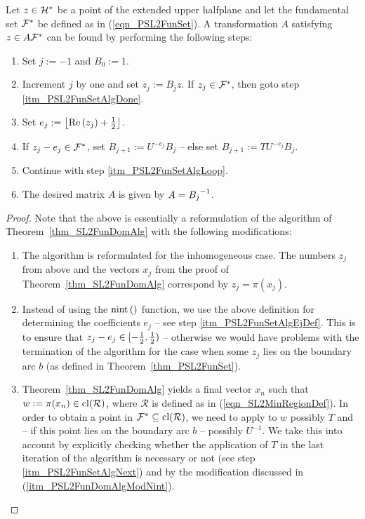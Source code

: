 \begin{theorem}
Let $z \in \mathcal{H}^\ast$ be a point of the extended upper halfplane and let the fundamental set $\mathcal{F}^\ast$ be defined as in (\ref{eqn_PSL2FunSet}). A transformation $A$ satisfying $z \in A \mathcal{F}^\ast$ can be found by performing the following steps:
\begin{enumerate}
\item Set $j := -1$ and $B_0 := 1$.
\item \label{itm_PSL2FunSetAlgLoop}
Increment $j$ by one and set $z_j := B_j z$. If $z_j \in \mathcal{F}^\ast$, then goto step \ref{itm_PSL2FunSetAlgDone}.
\item \label{itm_PSL2FunSetAlgEjDef}
Set $e_j := \left\lfloor \operatorname{Re}\left(z_j\right) + \frac{1}{2} \right\rfloor$. 
\item \label{itm_PSL2FunSetAlgNext}
If $z_j - e_j \in \mathcal{F}^\ast$, set $B_{j+1} := U^{-e_j}B_j$ -- else set $B_{j+1} := TU^{-e_j}B_j$.
\item Continue with step \ref{itm_PSL2FunSetAlgLoop}.
\item \label{itm_PSL2FunSetAlgDone} 
The desired matrix $A$ is given by $A = {B_j}^{-1}$.
\end{enumerate}
\end{theorem}
\begin{proof}
Note that the above is essentially a reformulation of the algorithm of Theorem~\ref{thm_SL2FunDomAlg} with the following modifications:
\begin{enumerate}[\quad (a)]
\item The algorithm is reformulated for the inhomogeneous case. The numbers $z_j$ from above and the vectors $x_j$ from the proof of Theorem~\ref{thm_SL2FunDomAlg} correspond by $z_j = \pi(x_j)$.
\item \label{itm_PSL2FunDomAlgModNint}
Instead of using the $\operatorname{nint}\left(  \right)$ function, we use the above definition  for determining the coefficients $e_j$ -- see step \ref{itm_PSL2FunSetAlgEjDef}. This is to ensure that $z_j - e_j \in [-\frac{1}{2}, \frac{1}{2})$ -- otherwise we would have problems with the termination of the algorithm for the case when some $z_j$ lies on the boundary arc $b$ (as defined in Theorem~\ref{thm_PSL2FunSet}).
\item Theorem~\ref{thm_SL2FunDomAlg} yields a final vector $x_n$ such that $w := \pi(x_n) \in \operatorname{cl}(\mathcal{R})$, where $\mathcal{R}$ is defined as in (\ref{eqn_SL2MinRegionDef}). In order to obtain a point in $\mathcal{F}^\ast \subseteq \operatorname{cl}(\mathcal{R})$, we need to apply to $w$ possibly $T$ and -- if this point lies on the boundary arc $b$ -- possibly $U^{-1}$. We take this into account by explicitly checking whether the application of $T$ in the last iteration of the algorithm is necessary or not (see step \ref{itm_PSL2FunSetAlgNext}) and by the modification discussed in (\ref{itm_PSL2FunDomAlgModNint}).\qedhere
\end{enumerate}
\end{proof}

